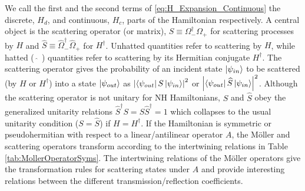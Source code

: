 We call the first and the second terms of \eqref{eq:H_Expansion_Continuous} the discrete, $H_d$, and continuous, $H_c$, parts of the Hamiltonian respectively. A central object is the scattering operator (or matrix), $S \equiv \Omega_-^\dagger \Omega_+$ for scattering processes by $H$ and $\widehat{S} \equiv \widehat{\Omega}_-^\dagger \widehat{\Omega}_+$ for $H^\dagger$. Unhatted quantities refer to scattering by $H$, while hatted ( $\widehat{\;}$ ) quantities refer to scattering by its Hermitian conjugate $H^\dagger$. The scattering operator gives the probability of an incident state $\ket{\psi_{in}}$ to be scattered (by $H$ or $H ^\dagger$) into a state $\ket{\psi_{out}}$ as $\left|\bra{\psi_{out}} S \ket{\psi_{in}}\right|^2$ or $\left|\bra{\psi_{out}} \widehat{S} \ket{\psi_{in}}\right|^2$. Although the scattering operator is not unitary for NH Hamiltonians, $S$ and $\widehat{S}$ obey the generalized unitarity relations $\widehat{S}^\dagger S = S\widehat{S}^\dagger= 1$ which collapses to the usual unitarity condition ($S = \widehat{S}$) if $H = H^\dagger$. If the Hamiltonian is symmetric or pseudohermitian with respect to a linear/antilinear operator $A$, the M\"oller and scattering operators transform according to the intertwining relations in Table \ref{tab:MollerOperatorSyms}. The intertwining relations of the M\"oller operators give the transformation rules for scattering states under $A$ and provide interesting relations between the different transmission/reflection coefficients.

